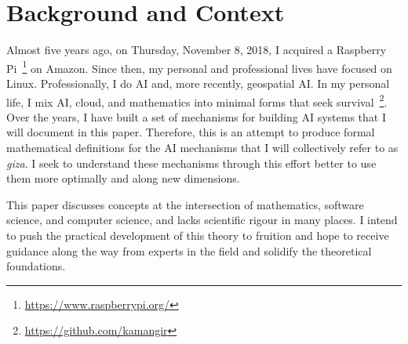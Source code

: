 \section*{Background and Context}

Almost five years ago, on Thursday, November 8, 2018, I acquired a Raspberry Pi~\footnote{\url{https://www.raspberrypi.org/}} on Amazon. Since then, my personal and professional lives have focused on Linux. Professionally, I do AI and, more recently, geospatial AI. In my personal life, I mix AI, cloud, and mathematics into minimal forms that seek survival~\footnote{\url{https://github.com/kamangir}}. Over the years, I have built a set of mechanisms for building AI systems that I will document in this paper. Therefore, this is an attempt to produce formal mathematical definitions for the AI mechanisms that I will collectively refer to as \emph{giza}. I seek to understand these mechanisms through this effort better to use them more optimally and along new dimensions.

This paper discusses concepts at the intersection of mathematics, software science, and computer science, and lacks scientific rigour in many places. I intend to push the practical development of this theory to fruition and hope to receive guidance along the way from experts in the field and solidify the theoretical foundations.